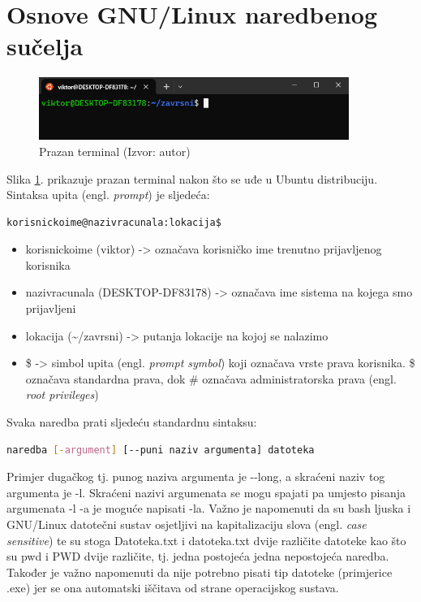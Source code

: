 \documentclass{foi}
\begin{document}
\section{Osnove GNU/Linux naredbenog sučelja}
\begin{figure}[H]
    \centering
    \includegraphics[width=0.9\textwidth]{slike/terminal.png}
    \caption{Prazan terminal (Izvor: autor)}
    \label{fig:terminal}
\end{figure}
Slika \ref{fig:terminal}. prikazuje prazan terminal nakon što se uđe u Ubuntu distribuciju. Sintaksa upita (engl. \textit{prompt}) je sljedeća:

\begin{lstlisting}[language=bash]
korisnickoime@nazivracunala:lokacija$
\end{lstlisting}

\begin{itemize}
    \item korisnickoime (viktor) -> označava korisničko ime trenutno prijavljenog korisnika
    \item nazivracunala (DESKTOP-DF83178) -> označava ime sistema na kojega smo prijavljeni
    \item lokacija (\textasciitilde{}/zavrsni) -> putanja lokacije na kojoj se nalazimo
    \item \$ -> simbol upita (engl. \textit{prompt symbol}) koji označava vrste prava korisnika. \$ označava standardna prava, dok \# označava administratorska prava (engl. \textit{root privileges})
\end{itemize}

\begin{flushleft}
Svaka naredba prati sljedeću standardnu sintaksu:
\end{flushleft}

\begin{lstlisting}[language=bash]
naredba [-argument] [--puni naziv argumenta] datoteka
\end{lstlisting}

\begin{flushleft}
Primjer dugačkog tj. punog naziva argumenta je -{}-long, a skraćeni naziv tog argumenta je -l. Skraćeni nazivi argumenata se mogu spajati pa umjesto pisanja argumenata -l -a je moguće napisati -la. Važno je napomenuti da su bash ljuska i GNU/Linux datotečni sustav osjetljivi na kapitalizaciju slova (engl. \textit{case sensitive}) te su stoga Datoteka.txt i datoteka.txt dvije različite datoteke kao što su pwd i PWD dvije različite, tj. jedna postojeća jedna nepostojeća naredba. Također je važno napomenuti da nije potrebno pisati tip datoteke (primjerice .exe) jer se ona automatski iščitava od strane operacijskog sustava.
\end{flushleft}
\end{document}
